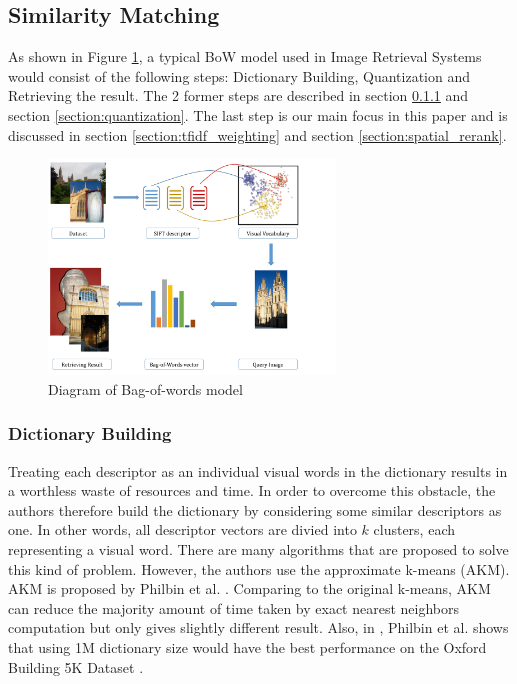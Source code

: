 \subsection{Similarity Matching} \label{section:similarity_extraction}

As shown in Figure \ref{fig:bow_model}, a typical BoW model used in Image Retrieval Systems would consist of the following steps: Dictionary Building, Quantization and Retrieving the result. The 2 former steps are described in section \ref{section:dictionary_building} and section \ref{section:quantization}. The last step is our main focus in this paper and is discussed in section \ref{section:tfidf_weighting} and section \ref{section:spatial_rerank}.

\begin{figure}
    \centering
    \includegraphics[width=3.0in]{process.pdf}
    \caption{Diagram of Bag-of-words model}
    \label{fig:bow_model}
\end{figure}

\subsubsection{Dictionary Building} \label{section:dictionary_building}
Treating each descriptor as an individual visual words in the dictionary results in a worthless waste of resources and time. In order to overcome this obstacle, the authors therefore build the dictionary by considering some similar descriptors as one. In other words, all descriptor vectors are divied into $k$ clusters, each representing a visual word. There are many algorithms that are proposed to solve this kind of problem. However, the authors use the approximate k-means (AKM). AKM is proposed by Philbin et al. \cite{2}. Comparing to the original k-means, AKM can reduce the majority amount of time taken by exact nearest neighbors computation but only gives slightly different result. Also, in \cite{2}, Philbin et al. shows that using 1M dictionary size would have the best performance on the Oxford Building 5K Dataset \cite{oxbuilding}.

